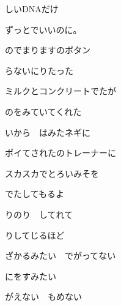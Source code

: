 \documentclass[a4paper,tate,twocolumn,12pt]{ltjtarticle}
\begin{document}
\thispagestyle{empty}

\begin{center}
{\LARGE {}しいDNAだけ}

{\large ずっとでいいのに。}
\end{center}

\vspace{1em}

\begin{flushleft}

\noindent\begin{minipage}{\linewidth}
のでまりますのボタン

らないにりたった

ミルクとコンクリートでたが

のをみていてくれた
\end{minipage}

\vspace{1em}

\noindent\begin{minipage}{\linewidth}
いから　はみたネギに

ポイてされたのトレーナーに

スカスカでとろいみそを

でたしてもるよ
\end{minipage}

\vspace{2em}

\noindent\begin{minipage}{\linewidth}
りのり　してれて

りしてじるほど

ざかるみたい　でがってない

にをすみたい
\end{minipage}

\vspace{1em}

\noindent\begin{minipage}{\linewidth}
がえない　もめない


\end{minipage}
\end{flushleft}
\end{document}

